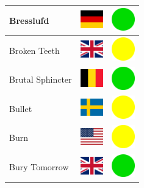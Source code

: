 \documentclass[12pt, a4paper, twoside]{report}
\begin{document}
\begin{center}
\begin{longtable}{|p{5cm}|p{2cm}|p{2cm}|}
 Bresslufd                                                  & \includegraphics[width=1cm]{4x3/de} &   \includegraphics[width=1cm]{likes/y} \\ \hline
 Broken Teeth                                               & \includegraphics[width=1cm]{4x3/gb} &   \includegraphics[width=1cm]{likes/m} \\ \hline
 Brutal Sphincter                                           & \includegraphics[width=1cm]{4x3/be} &   \includegraphics[width=1cm]{likes/y} \\ \hline
 Bullet                                                     & \includegraphics[width=1cm]{4x3/se} &   \includegraphics[width=1cm]{likes/m} \\ \hline
 Burn                                                       & \includegraphics[width=1cm]{4x3/us} &   \includegraphics[width=1cm]{likes/m} \\ \hline
 Bury Tomorrow                                              & \includegraphics[width=1cm]{4x3/gb} &   \includegraphics[width=1cm]{likes/y} \\ \hline

\end{longtable}
\end{center}
\end{document}

